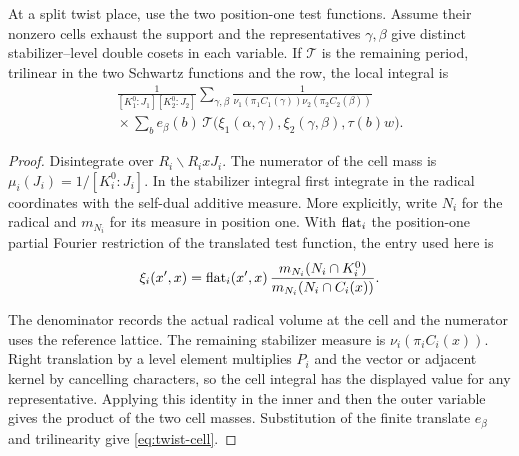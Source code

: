 \begin{lemma}\label{lem:joint-twist-cells}
At a split twist place, use the two position-one test functions.
Assume their nonzero cells exhaust the support and the representatives
\(\gamma,\beta\) give distinct stabilizer--level double cosets in
each variable.
If \(\mathcal T\) is the remaining period, trilinear in the two
Schwartz functions and the row, the local integral is
\begin{multline}\label{eq:twist-cell}
 \frac{1}{[K_1^0:J_1][K_2^0:J_2]}
 \sum_{\gamma,\beta}
 \frac{1}{\nu_1(\pi_1 C_1(\gamma))\nu_2(\pi_2 C_2(\beta))}
 \\ {}\times
 \sum_b e_\beta(b)\,
 \mathcal T\bigl(\xi_1(\alpha,\gamma),\xi_2(\gamma,\beta),
                           \tau(b)w\bigr).
\end{multline}
\end{lemma}
\begin{proof}
Disintegrate over \(R_i\backslash R_i xJ_i\).
The numerator of the cell mass is \(\mu_i(J_i)=1/[K_i^0:J_i]\).
In the stabilizer integral first integrate
in the radical coordinates with the self-dual additive measure.
More explicitly, write \(N_i\) for the radical and \(m_{N_i}\)
for its measure in position one. With \({\rm flat}_i\) the
position-one partial Fourier restriction of the translated
test function, the entry used here is
\[
 \xi_i(x',x)= {\rm flat}_i(x',x)\,
   \frac{m_{N_i}(N_i\cap K_i^0)}
        {m_{N_i}(N_i\cap C_i(x))}.
\]

The denominator records the actual radical volume at the cell
and the numerator uses the reference lattice. The remaining
stabilizer measure is \(\nu_i(\pi_i C_i(x))\). Right
translation by a level element multiplies \(P_i\) and the
vector or adjacent kernel by cancelling characters, so the
cell integral has the displayed value for any representative.
Applying this identity in the inner and then the outer variable
gives the product of the two cell masses. Substitution of the
finite translate \(e_\beta\) and trilinearity give \eqref{eq:twist-cell}.
\end{proof}


